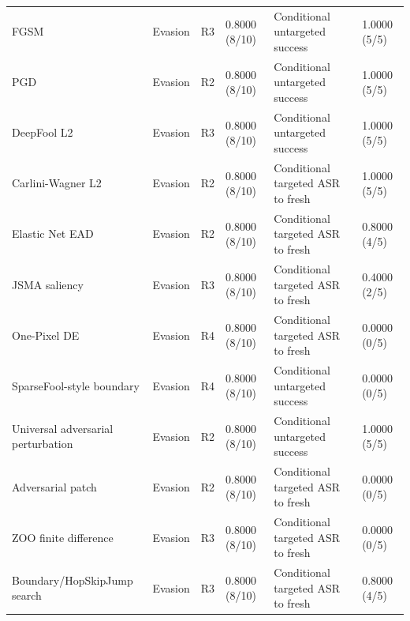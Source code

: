 \documentclass[conference]{IEEEtran}
\begin{document}
\begin{table}[t]
\begin{tabular}{p{}p{}p{}p{}p{}p{}}
FGSM & Evasion & R3 & 0.8000 (8/10) & Conditional untargeted success & 1.0000 (5/5) \\
PGD & Evasion & R2 & 0.8000 (8/10) & Conditional untargeted success & 1.0000 (5/5) \\
DeepFool L2 & Evasion & R3 & 0.8000 (8/10) & Conditional untargeted success & 1.0000 (5/5) \\
Carlini-Wagner L2 & Evasion & R2 & 0.8000 (8/10) & Conditional targeted ASR to fresh & 1.0000 (5/5) \\
Elastic Net EAD & Evasion & R2 & 0.8000 (8/10) & Conditional targeted ASR to fresh & 0.8000 (4/5) \\
JSMA saliency & Evasion & R3 & 0.8000 (8/10) & Conditional targeted ASR to fresh & 0.4000 (2/5) \\
One-Pixel DE & Evasion & R4 & 0.8000 (8/10) & Conditional targeted ASR to fresh & 0.0000 (0/5) \\
SparseFool-style boundary & Evasion & R4 & 0.8000 (8/10) & Conditional untargeted success & 0.0000 (0/5) \\
Universal adversarial perturbation & Evasion & R2 & 0.8000 (8/10) & Conditional untargeted success & 1.0000 (5/5) \\
Adversarial patch & Evasion & R2 & 0.8000 (8/10) & Conditional targeted ASR to fresh & 0.0000 (0/5) \\
ZOO finite difference & Evasion & R3 & 0.8000 (8/10) & Conditional targeted ASR to fresh & 0.0000 (0/5) \\
Boundary/HopSkipJump search & Evasion & R3 & 0.8000 (8/10) & Conditional targeted ASR to fresh & 0.8000 (4/5) \\
\bottomrule
\end{tabular}
\end{table}
\end{document}
